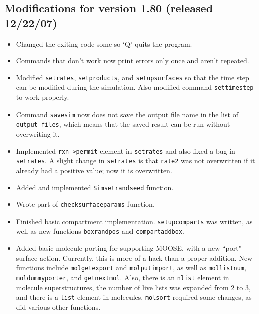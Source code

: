 \documentclass {scrbook}
\newcommand {\ttt} {\texttt}
\begin{document}
\subsection{Modifications for version 1.80 (released 12/22/07)}
\begin{itemize}
\item Changed the exiting code some so `Q' quits the program.
\item Commands that don't work now print errors only once and aren't repeated.
\item Modified \ttt{setrates}, \ttt{setproducts}, and \ttt{setupsurfaces} so that the time step can be modified during the simulation. Also modified command \ttt{settimestep} to work properly.
\item Command \ttt{savesim} now does not save the output file name in the list of \ttt{output\_files}, which means that the saved result can be run without overwriting it.
\item Implemented \ttt{rxn->permit} element in \ttt{setrates} and also fixed a bug in \ttt{setrates}. A slight change in \ttt{setrates} is that \ttt{rate2} was not overwritten if it already had a positive value; now it is overwritten.
\item Added and implemented \ttt{Simsetrandseed} function.
\item Wrote part of \ttt{checksurfaceparams} function.
\item Finished basic compartment implementation. \ttt{setupcomparts} was written, as well as new functions \ttt{boxrandpos} and \ttt{compartaddbox}.
\item Added basic molecule porting for supporting MOOSE, with a new ``port" surface action. Currently, this is more of a hack than a proper addition. New functions include \ttt{molgetexport} and \ttt{molputimport}, as well as \ttt{mollistnum}, \ttt{moldummyporter}, and \ttt{getnextmol}. Also, there is an \ttt{nlist} element in molecule superstructures, the number of live lists was expanded from 2 to 3, and there is a \ttt{list} element in molecules. \ttt{molsort} required some changes, as did various other functions.
\end{itemize}
\end{document}
